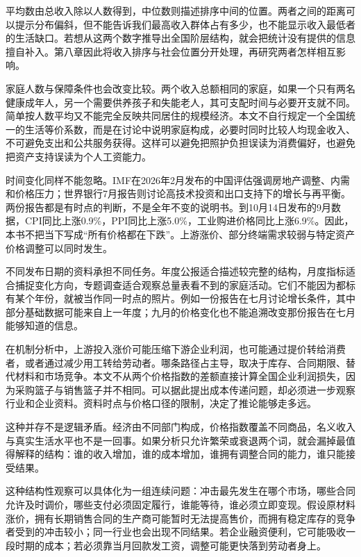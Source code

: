\documentclass[UTF8,fontset=fandol,zihao=-4,oneside,openany]{ctexbook}
\begin{document}
\label{arg:P005}
平均数由总收入除以人数得到，中位数则描述排序中间的位置。两者之间的距离可以提示分布偏斜，但不能告诉我们最高收入群体占有多少，也不能显示收入最低者的生活缺口。若想从这两个数字推导出全国阶层结构，就会把统计没有提供的信息擅自补入。第八章因此将收入排序与社会位置分开处理，再研究两者怎样相互影响。

家庭人数与保障条件也会改变比较。两个收入总额相同的家庭，如果一个只有两名健康成年人，另一个需要供养孩子和失能老人，其可支配时间与必要开支就不同。简单按人数平均又不能完全反映共同居住的规模经济。本文不自行规定一个全国统一的生活等价系数，而是在讨论中说明家庭构成，必要时同时比较人均现金收入、不可避免支出和公共服务获得。这样可以避免把照护负担误读为消费偏好，也避免把资产支持误读为个人工资能力。

时间变化同样不能忽略。IMF在2026年2月发布的中国评估强调房地产调整、内需和价格压力；世界银行7月报告则讨论高技术投资和出口支持下的增长与再平衡。两份报告都是有时点的判断，不是全年不变的说明书。到10月14日发布的9月数据，CPI同比上涨0.9\%，PPI同比上涨5.0\%，工业购进价格同比上涨6.9\%。因此，本书不把当下写成“所有价格都在下跌”。上游涨价、部分终端需求较弱与特定资产价格调整可以同时发生。\cite{IMF2026,WB2026,CPI2026,PPI2026}

\label{arg:P006}
不同发布日期的资料承担不同任务。年度公报适合描述较完整的结构，月度指标适合捕捉变化方向，专题调查适合观察总量表看不到的家庭活动。它们不能因为都标有某个年份，就被当作同一时点的照片。例如一份报告在七月讨论增长条件，其中部分基础数据可能来自上一年度；九月的价格变化也不能追溯改变那份报告在七月能够知道的信息。

在机制分析中，上游投入涨价可能压缩下游企业利润，也可能通过提价转给消费者，或者通过减少用工转给劳动者。哪条路径占主导，取决于库存、合同期限、替代材料和市场竞争。本文不从两个价格指数的差额直接计算全国企业利润损失，因为采购篮子与销售篮子并不相同。可以据此提出成本传递问题，却必须进一步观察行业和企业资料。资料时点与价格口径的限制，决定了推论能够走多远。

这种并存不是逻辑矛盾。经济由不同部门构成，价格指数覆盖不同商品，名义收入与真实生活水平也不是一回事。如果分析只允许繁荣或衰退两个词，就会漏掉最值得解释的结构：谁的收入增加，谁的成本增加，谁拥有调整合同的能力，谁只能接受结果。

\label{arg:P007}
这种结构性观察可以具体化为一组连续问题：冲击最先发生在哪个市场，哪些合同允许及时调价，哪些支付必须固定履行，谁能等待，谁必须立即变现。假设原材料涨价，拥有长期销售合同的生产商可能暂时无法提高售价，而拥有稳定库存的竞争者受到的冲击较小；同一行业也会出现不同结果。若企业融资便利，它可能吸收一段时期的成本；若必须靠当月回款发工资，调整可能更快落到劳动者身上。
\end{document}
